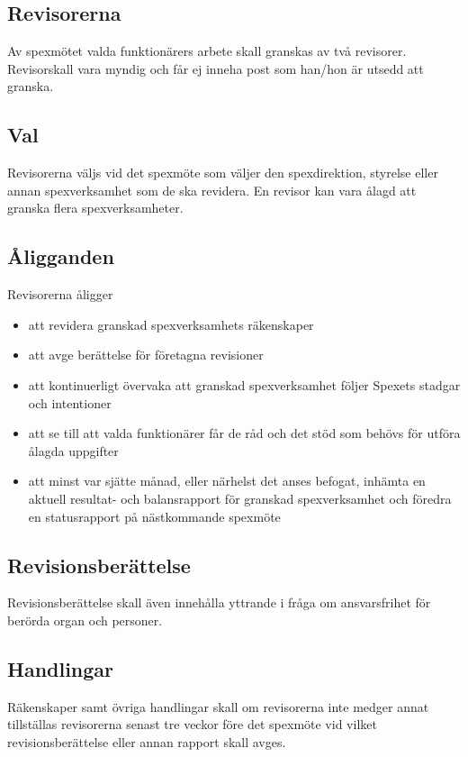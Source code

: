 \documentclass[a4paper]{article}
\begin{document}
\subsection{Revisorerna}
Av spexmötet valda funktionärers arbete skall granskas av två revisorer. Revisorskall vara myndig och får ej inneha post som han/hon är utsedd att granska.

\subsection{Val}
Revisorerna väljs vid det spexmöte som väljer den spexdirektion, styrelse eller annan spexverksamhet som de ska revidera. En revisor kan vara ålagd att granska flera spexverksamheter.

\subsection{Åligganden}
Revisorerna åligger

\begin{itemize}
  \item att revidera granskad spexverksamhets räkenskaper
  \item att avge berättelse för företagna revisioner
  \item att kontinuerligt övervaka att granskad spexverksamhet följer Spexets stadgar och intentioner
  \item att se till att valda funktionärer får de råd och det stöd som behövs för utföra ålagda uppgifter
  \item att minst var sjätte månad, eller närhelst det anses befogat, inhämta en aktuell resultat- och balansrapport för granskad spexverksamhet och föredra en statusrapport på nästkommande spexmöte
\end{itemize}

\subsection{Revisionsberättelse}
Revisionsberättelse skall även innehålla yttrande i fråga om ansvarsfrihet för berörda organ och personer.

\subsection{Handlingar}
Räkenskaper samt övriga handlingar skall om revisorerna inte medger annat tillställas revisorerna senast tre veckor före det spexmöte vid vilket revisionsberättelse eller annan rapport skall avges.
\end{document}
